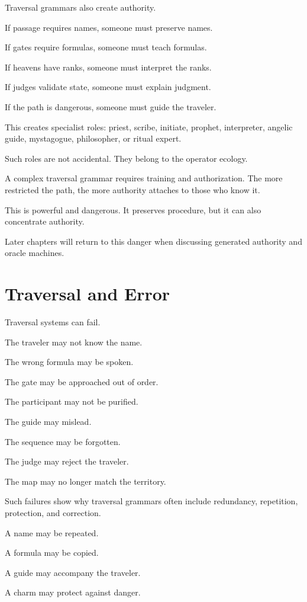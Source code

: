 \documentclass[11pt]{book}
\begin{document}
Traversal grammars also create authority.

If passage requires names, someone must preserve names.

If gates require formulas, someone must teach formulas.

If heavens have ranks, someone must interpret the ranks.

If judges validate state, someone must explain judgment.

If the path is dangerous, someone must guide the traveler.

This creates specialist roles: priest, scribe, initiate, prophet, interpreter, angelic guide, mystagogue, philosopher, or ritual expert.

Such roles are not accidental. They belong to the operator ecology.

A complex traversal grammar requires training and authorization. The more restricted the path, the more authority attaches to those who know it.

This is powerful and dangerous. It preserves procedure, but it can also concentrate authority.

Later chapters will return to this danger when discussing generated authority and oracle machines.

\section{Traversal and Error}

Traversal systems can fail.

The traveler may not know the name.

The wrong formula may be spoken.

The gate may be approached out of order.

The participant may not be purified.

The guide may mislead.

The sequence may be forgotten.

The judge may reject the traveler.

The map may no longer match the territory.

Such failures show why traversal grammars often include redundancy, repetition, protection, and correction.

A name may be repeated.

A formula may be copied.

A guide may accompany the traveler.

A charm may protect against danger.
\end{document}
